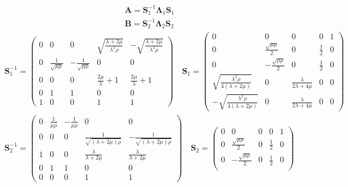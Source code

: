 \begin{gather*}
    \pmb{A} = \pmb{S}^{-1}_1 \pmb{\Lambda}_1 \pmb{S}_1 \\
    \pmb{B} = \pmb{S}^{-1}_2 \pmb{\Lambda}_2 \pmb{S}_2
\end{gather*}
\begin{gather*}
    \pmb{S}^{-1}_1 = 
    \begin{pmatrix}
        0 & 0 & 0 & \sqrt{\frac{\lambda + 2\mu}{\lambda^2 \rho}} & -\sqrt{\frac{\lambda + 2\mu}{\lambda^2 \rho}} \\
        0 & \frac{1}{\sqrt{\mu\rho}} & -\frac{1}{\sqrt{\mu\rho}} & 0 & 0 \\
        0 & 0 & 0 & \frac{2\mu}{\lambda} + 1 & \frac{2\mu}{\lambda} + 1 \\
        0 & 1 & 1 & 0 & 0 \\
        1 & 0 & 0 & 1 & 1
    \end{pmatrix}
    \quad
    \pmb{S}_1 = 
    \begin{pmatrix}
        0 & 0 & 0 & 0 & 1 \\
        0 & \frac{\sqrt{\mu\rho}}{2} & 0 & \frac{1}{2} & 0 \\
        0 & -\frac{\sqrt{\mu\rho}}{2} & 0 & \frac{1}{2} & 0 \\
        \sqrt{\frac{\lambda^2 \rho}{4\left(\lambda+2\mu\right)}} & 0 & \frac{\lambda}{2\lambda + 4\mu} & 0 & 0 \\
        -\sqrt{\frac{\lambda^2 \rho}{4\left(\lambda+2\mu\right)}} & 0 & \frac{\lambda}{2\lambda + 4\mu} & 0 & 0
    \end{pmatrix}
    \\
    \pmb{S}^{-1}_2 = 
    \begin{pmatrix}
        0 & \frac{1}{\mu\rho} & -\frac{1}{\mu\rho} & 0 & 0 \\
        0 & 0 & 0 & \frac{1}{\sqrt{\left(\lambda+2\mu\right)\rho}} & -\frac{1}{\sqrt{\left(\lambda+2\mu\right)\rho}} \\
        1 & 0 & 0 & \frac{\lambda}{\lambda+2\mu} & \frac{\lambda}{\lambda+2\mu} \\
        0 & 1 & 1 & 0 & 0 \\
        0 & 0 & 0 & 1 & 1
    \end{pmatrix}
    \quad
    \pmb{S}_2 = 
    \begin{pmatrix}
        0 & 0 & 0 & 0 & 1 \\
        0 & \frac{\sqrt{\mu\rho}}{2} & 0 & \frac{1}{2} & 0 \\
        0 & -\frac{\sqrt{\mu\rho}}{2} & 0 & \frac{1}{2} & 0 \\

\end{pmatrix}
\end{gather*}
